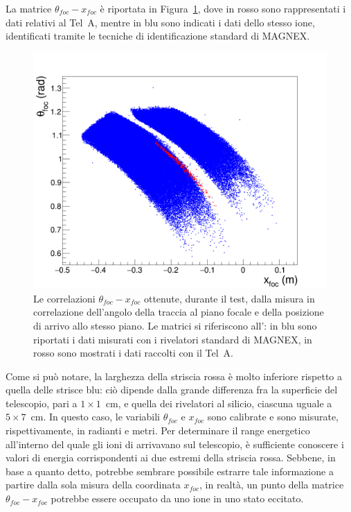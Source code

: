 La matrice $\theta_{foc} - x_{foc}$ è riportata in Figura~\ref{fig:tefoc_xfoc2}, dove in rosso sono rappresentati i dati relativi al Tel~A, mentre in blu sono indicati i dati dello stesso ione, identificati tramite le tecniche di identificazione standard di MAGNEX.
\begin{figure} [!p]
	\centering
	\includegraphics[width=\textwidth, keepaspectratio]{Grafici_Tesi/Test/matrice_tefoc_xfoc.png}
	\caption{Le correlazioni $\theta_{foc} - x_{foc}$ ottenute, durante il test, dalla misura in correlazione dell'angolo della traccia al piano focale e della posizione di arrivo allo stesso piano. Le matrici si riferiscono all': in blu sono riportati i dati misurati con i rivelatori standard di MAGNEX, in rosso sono mostrati i dati raccolti con il Tel~A.} \label{fig:tefoc_xfoc2}
\end{figure}
Come si può notare, la larghezza della striscia rossa è molto inferiore rispetto a quella delle strisce blu: ciò dipende dalla grande differenza fra la superficie del telescopio, pari a $1 \times 1$~cm, e quella dei rivelatori al silicio, ciascuna uguale a $5 \times 7$~cm.
In questo caso, le variabili $\theta_{foc}$ e $x_{foc}$ sono calibrate e sono misurate, rispettivamente, in radianti e metri.
Per determinare il range energetico all'interno del quale gli ioni di  arrivavano sul telescopio, è sufficiente conoscere i valori di energia corrispondenti ai due estremi della striscia rossa.
Sebbene, in base a quanto detto, potrebbe sembrare possibile estrarre tale informazione a partire dalla sola misura della coordinata $x_{foc}$, in realtà, un punto della matrice $\theta_{foc} - x_{foc}$ potrebbe essere occupato da uno ione in uno stato eccitato.
